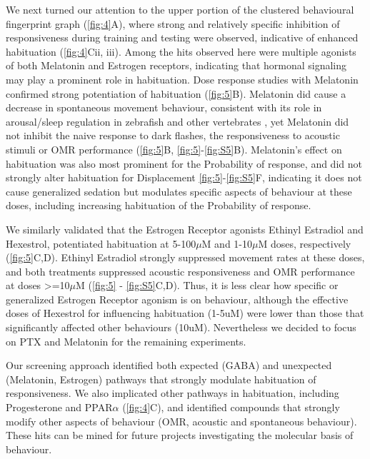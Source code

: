 \documentclass[9pt,lineno]{RandlettLab_elife}
\begin{document}
We next turned our attention to the upper portion of the clustered behavioural fingerprint graph (\autoref{fig:4}A), where strong and relatively specific inhibition of responsiveness during training and testing were observed, indicative of enhanced habituation (\autoref{fig:4}Cii, iii). Among the hits observed here were multiple agonists of both Melatonin and Estrogen receptors, indicating that hormonal signaling may play a prominent role in habituation. Dose response studies with Melatonin confirmed strong potentiation of habituation (\autoref{fig:5}B). Melatonin did cause a decrease in spontaneous movement behaviour, consistent with its role in arousal/sleep regulation in zebrafish and other vertebrates \citep{Gandhi2015-vw, Zhdanova2001-tk}, yet Melatonin did not inhibit the naive response to dark flashes, the responsiveness to acoustic stimuli or OMR performance (\autoref{fig:5}B, \autoref{fig:5}-\autoref{fig:S5}B). Melatonin's effect on habituation was also most prominent for the Probability of response, and did not strongly alter habituation for Displacement \autoref{fig:5}-\autoref{fig:S5}F, indicating it does not cause generalized sedation but modulates specific aspects of behaviour at these doses, including increasing habituation of the Probability of response. 

We similarly validated that the Estrogen Receptor agonists Ethinyl Estradiol and Hexestrol, potentiated habituation at 5-100$\mu$M and 1-10$\mu$M doses, respectively (\autoref{fig:5}C,D). Ethinyl Estradiol strongly suppressed movement rates at these doses, and both treatments suppressed acoustic responsiveness and OMR performance at doses >=10$\mu$M (\autoref{fig:5} - \autoref{fig:S5}C,D). Thus, it is less clear how specific or generalized Estrogen Receptor agonism is on behaviour, although the effective doses of Hexestrol for influencing habituation (1-5uM) were lower than those that significantly affected other behaviours (10uM). Nevertheless we decided to focus on PTX and Melatonin for the remaining experiments. 

Our screening approach identified both expected (GABA) and unexpected (Melatonin, Estrogen) pathways that strongly modulate habituation of responsiveness. We also implicated other pathways in habituation, including Progesterone and PPAR$\alpha$ (\autoref{fig:4}C), and identified compounds that strongly modify other aspects of behaviour (OMR, acoustic and spontaneous behaviour). These hits can be mined for future projects investigating the molecular basis of behaviour. 
\end{document}
